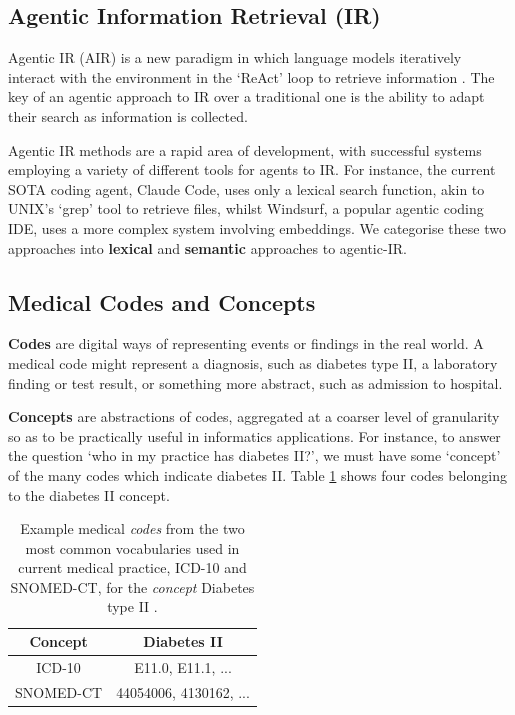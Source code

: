 \documentclass[11pt]{article}
\begin{document}
\subsection{Agentic Information Retrieval (IR)}
Agentic IR (AIR) is a new paradigm in which language models iteratively interact with the environment in the `ReAct' loop to retrieve information \citet{zhang_agentic_2025}.
The key of an agentic approach to IR over a traditional one is the ability to adapt their search as information is collected.

Agentic IR methods are a rapid area of development, with successful systems employing a variety of different tools for agents to IR.
For instance, the current SOTA coding agent, Claude Code, uses only a lexical search function, akin to UNIX's `grep' tool to retrieve files, whilst Windsurf, a popular agentic coding IDE, uses a more complex system involving embeddings. We categorise these two approaches into \textbf{lexical} and \textbf{semantic} approaches to agentic-IR.

\subsection{Medical Codes and Concepts}

\textbf{Codes} are digital ways of representing events or findings in the real world. A medical code might represent a diagnosis, such as diabetes type II, a laboratory finding or test result, or something more abstract, such as admission to hospital.

\textbf{Concepts} are abstractions of codes, aggregated at a coarser level of granularity so as to be practically useful in informatics applications.
For instance, to answer the question `who in my practice has diabetes II?', we must have some `concept' of the many codes which indicate diabetes II. Table \ref{tab:concept-as-multi-vocab-codelist} shows four codes belonging to the diabetes II concept.


\begin{table}[h]
    \centering
    \begin{tabular}{c|c}
         Concept & Diabetes II \\
         \hline
         ICD-10 & E11.0, E11.1, ... \\
         SNOMED-CT & 44054006, 4130162, ...\\
    \end{tabular}
    \caption{Example medical \textit{codes} from the two most common vocabularies used in current medical practice, ICD-10 and SNOMED-CT, for the \textit{concept} Diabetes type II \cite{world_health_organization_icd-10_2004, bhattacharyya_introduction_2015}.}
    \label{tab:concept-as-multi-vocab-codelist}
\end{table}
\end{document}
